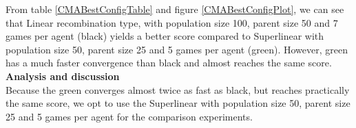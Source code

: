 From table \ref{CMABestConfigTable} and figure \ref{CMABestConfigPlot}, we can see that
Linear recombination type, with population size 100, parent size 50 and 7 games per agent
(black) yields a better score compared to Superlinear with population size 50, parent size 25 and 5 games per agent (green).
However, green has a much faster convergence than black and almost reaches the same score.\\


\textbf{Analysis and discussion}\\
Because the green converges almost twice as fast as black, but reaches practically the same
score, we opt to use the Superlinear with population size 50, parent size 25 and 5 games per agent for the comparison experiments.









